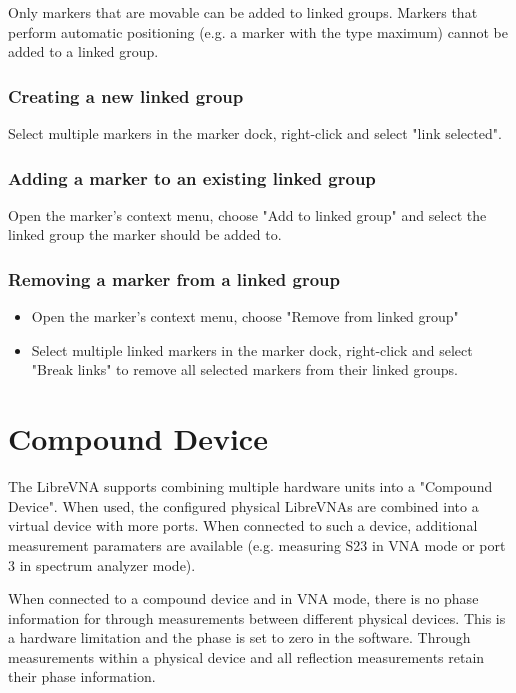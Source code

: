 \documentclass[a4paper,11pt]{article}
\newcommand\danger[1][5ex]{%
  \renewcommand\stacktype{L}%
  \scaleto{\stackon[1.3pt]{\color{red}$\triangle$}{\tiny !}}{#1}%
}
\newenvironment{important}[1][]{%
   \begin{mdframed}[%
      backgroundcolor={red!15}, hidealllines=true,
      skipabove=0.7\baselineskip, skipbelow=0.7\baselineskip,
      splitbottomskip=2pt, splittopskip=4pt, #1]%
   \makebox[0pt]{%
      \smash{%
         \hspace*{-45pt}%
         \raisebox{-5pt}{%
            {\danger}%
         }%
      }%
   }%
}{\end{mdframed}}
\begin{document}
Only markers that are movable can be added to linked groups. Markers that perform automatic positioning (e.g. a marker with the type maximum) cannot be added to a linked group.

\subsubsection{Creating a new linked group}
Select multiple markers in the marker dock, right-click and select "link selected".
\subsubsection{Adding a marker to an existing linked group}
Open the marker's context menu, choose "Add to linked group" and select the linked group the marker should be added to.
\subsubsection{Removing a marker from a linked group}
\begin{itemize}
\item Open the marker's context menu, choose "Remove from linked group"
\item Select multiple linked markers in the marker dock, right-click and select "Break links" to remove all selected markers from their linked groups.
\end{itemize}

\section{Compound Device}
The LibreVNA supports combining multiple hardware units into a "Compound Device". When used, the configured physical LibreVNAs are combined into a virtual device with more ports. When connected to such a device, additional measurement paramaters are available (e.g. measuring S23 in VNA mode or port 3 in spectrum analyzer mode).

\begin{important}
When connected to a compound device and in VNA mode, there is no phase information for through measurements between different physical devices. This is a hardware limitation and the phase is set to zero in the software. Through measurements within a physical device and all reflection measurements retain their phase information.
\end{important}
\end{document}

